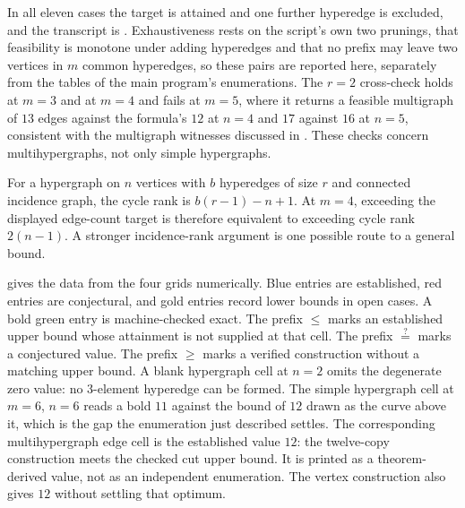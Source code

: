 In all eleven cases the target is attained and one further hyperedge is
excluded, and the transcript is
. Exhaustiveness rests on the
script's own two prunings, that feasibility is monotone under adding hyperedges
and that no prefix may leave two vertices in $m$ common hyperedges, so these
pairs are reported here, separately from the tables of the main program's
enumerations. The $r=2$ cross-check holds at
$m=3$ and at $m=4$ and fails at $m=5$, where it returns a feasible multigraph
of $13$ edges against the formula's $12$ at $n=4$ and $17$ against $16$ at
$n=5$, consistent with the multigraph witnesses discussed in
. These checks concern multihypergraphs, not only simple
hypergraphs.

For a hypergraph on $n$ vertices with $b$ hyperedges of size $r$ and connected
incidence graph, the cycle rank is $b(r-1)-n+1$. At $m=4$, exceeding the
displayed edge-count target is therefore equivalent to exceeding cycle rank
$2(n-1)$. A stronger incidence-rank argument is one possible route to a
general bound.

 gives the data from the four grids numerically.
Blue entries are established, red entries are conjectural, and gold entries record lower bounds in open cases.
A bold green entry is machine-checked exact.
The prefix $\le$ marks an established upper bound whose attainment is not supplied at that cell. The prefix $\stackrel{?}{=}$ marks a conjectured value.
The prefix $\ge$ marks a verified construction without a matching upper bound.
A blank hypergraph cell at $n=2$ omits the degenerate zero value: no $3$-element hyperedge can be formed.
The simple hypergraph cell at $m=6$, $n=6$ reads a bold $11$ against the bound of $12$ drawn as the curve above it, which is the gap the enumeration just described settles.
The corresponding multihypergraph edge cell is the established value $12$: the twelve-copy construction meets the checked cut upper bound. It is printed as a theorem-derived value, not as an independent enumeration.
The vertex construction also gives $12$ without settling that optimum.

\begin{table}[p]
    \centering
    \footnotesize
    \resizebox{\textwidth}{!}{%
    }
    \caption{Finite values and bounds for all sixteen variants at $m=3$ and $m=6$. The colours and markers match the four grids above.}
    \label{tab:variant-values}
\end{table}


